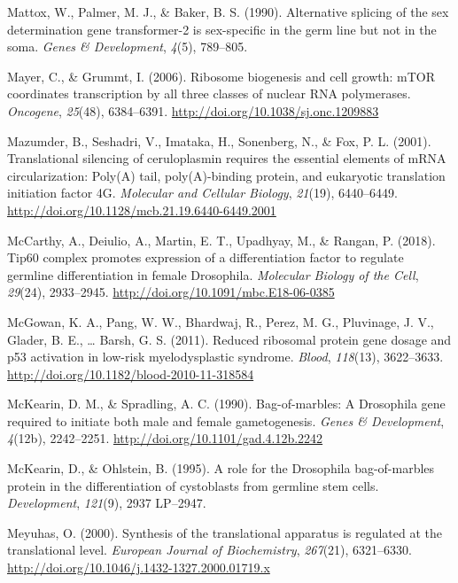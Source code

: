 \documentclass[12pt,twoside]{reedthesis}
\newlength{\cslhangindent}
\newenvironment{cslreferences}%
  {\setlength{\parindent}{0pt}%
  \everypar{\setlength{\hangindent}{\cslhangindent}}\ignorespaces}%
  {\par}
\begin{document}
\begin{cslreferences}
\leavevmode\hypertarget{ref-Mattox1990}{}%
Mattox, W., Palmer, M. J., \& Baker, B. S. (1990). Alternative splicing of the sex determination gene transformer-2 is sex-specific in the germ line but not in the soma. \emph{Genes \& Development}, \emph{4}(5), 789--805.

\leavevmode\hypertarget{ref-Mayer2006a}{}%
Mayer, C., \& Grummt, I. (2006). Ribosome biogenesis and cell growth: mTOR coordinates transcription by all three classes of nuclear RNA polymerases. \emph{Oncogene}, \emph{25}(48), 6384--6391. \url{http://doi.org/10.1038/sj.onc.1209883}

\leavevmode\hypertarget{ref-Mazumder2001k}{}%
Mazumder, B., Seshadri, V., Imataka, H., Sonenberg, N., \& Fox, P. L. (2001). Translational silencing of ceruloplasmin requires the essential elements of mRNA circularization: Poly(A) tail, poly(A)-binding protein, and eukaryotic translation initiation factor 4G. \emph{Molecular and Cellular Biology}, \emph{21}(19), 6440--6449. \url{http://doi.org/10.1128/mcb.21.19.6440-6449.2001}

\leavevmode\hypertarget{ref-McCarthy2018h}{}%
McCarthy, A., Deiulio, A., Martin, E. T., Upadhyay, M., \& Rangan, P. (2018). Tip60 complex promotes expression of a differentiation factor to regulate germline differentiation in female Drosophila. \emph{Molecular Biology of the Cell}, \emph{29}(24), 2933--2945. \url{http://doi.org/10.1091/mbc.E18-06-0385}

\leavevmode\hypertarget{ref-mcgowanReducedRibosomalProtein2011}{}%
McGowan, K. A., Pang, W. W., Bhardwaj, R., Perez, M. G., Pluvinage, J. V., Glader, B. E., \ldots{} Barsh, G. S. (2011). Reduced ribosomal protein gene dosage and p53 activation in low-risk myelodysplastic syndrome. \emph{Blood}, \emph{118}(13), 3622--3633. \url{http://doi.org/10.1182/blood-2010-11-318584}

\leavevmode\hypertarget{ref-McKearin1990e}{}%
McKearin, D. M., \& Spradling, A. C. (1990). Bag-of-marbles: A Drosophila gene required to initiate both male and female gametogenesis. \emph{Genes \& Development}, \emph{4}(12b), 2242--2251. \url{http://doi.org/10.1101/gad.4.12b.2242}

\leavevmode\hypertarget{ref-McKearin1995b}{}%
McKearin, D., \& Ohlstein, B. (1995). A role for the Drosophila bag-of-marbles protein in the differentiation of cystoblasts from germline stem cells. \emph{Development}, \emph{121}(9), 2937 LP--2947.

\leavevmode\hypertarget{ref-meyuhasSynthesisTranslationalApparatus2000}{}%
Meyuhas, O. (2000). Synthesis of the translational apparatus is regulated at the translational level. \emph{European Journal of Biochemistry}, \emph{267}(21), 6321--6330. \url{http://doi.org/10.1046/j.1432-1327.2000.01719.x}


\end{cslreferences}
\end{document}
